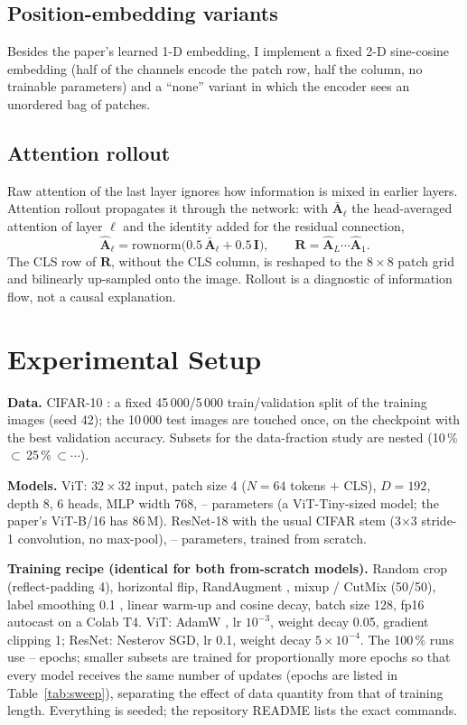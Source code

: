 \documentclass[conference]{IEEEtran}
\newif\ifdraft \drafttrue
\newcommand{\verify}[1]{\ifdraft{\color{red}#1}\else#1\fi}
\newcommand{\paramsVit}{--}\newcommand{\paramsRes}{--}\newcommand{\epochsVit}{--}\newcommand{\epochsRes}{--}
\begin{document}
\subsection{Position-embedding variants}
Besides the paper's learned 1-D embedding, I implement a fixed 2-D sine-cosine embedding (half of the channels encode the patch row, half the column, no trainable parameters) and a ``none'' variant in which the encoder sees an unordered bag of patches.

\subsection{Attention rollout}
Raw attention of the last layer ignores how information is mixed in earlier layers. Attention rollout \cite{abnar2020} propagates it through the network: with $\bar{\mathbf{A}}_\ell$ the head-averaged attention of layer $\ell$ and the identity added for the residual connection,
\begin{equation}
\hat{\mathbf{A}}_\ell=\mathrm{rownorm}\big(0.5\,\bar{\mathbf{A}}_\ell+0.5\,\mathbf{I}\big),\qquad
\mathbf{R}=\hat{\mathbf{A}}_L\cdots\hat{\mathbf{A}}_1 .
\end{equation}
The CLS row of $\mathbf{R}$, without the CLS column, is reshaped to the $8\times8$ patch grid and bilinearly up-sampled onto the image. Rollout is a diagnostic of information flow, not a causal explanation.

\section{Experimental Setup}\label{sec:setup}
\textbf{Data.} CIFAR-10 \cite{krizhevsky2009}: a fixed 45\,000/5\,000 train/validation split of the training images (seed 42); the 10\,000 test images are touched once, on the checkpoint with the best validation accuracy. Subsets for the data-fraction study are nested (10\,\%\,$\subset$\,25\,\%\,$\subset\cdots$).

\textbf{Models.} ViT: $32\times32$ input, patch size 4 ($N{=}64$ tokens $+$ CLS), $D{=}192$, depth 8, 6 heads, MLP width 768, \paramsVit{} parameters (a ViT-Tiny-sized model; the paper's ViT-B/16 has 86\,M). ResNet-18 \cite{he2016} with the usual CIFAR stem (3$\times$3 stride-1 convolution, no max-pool), \paramsRes{} parameters, trained from scratch.

\textbf{Training recipe (identical for both from-scratch models).} Random crop (reflect-padding 4), horizontal flip, RandAugment \cite{cubuk2020}, mixup \cite{zhang2018} / CutMix \cite{yun2019} (50/50), label smoothing 0.1 \cite{szegedy2016}, linear warm-up and cosine decay, batch size 128, fp16 autocast on a Colab T4. ViT: AdamW \cite{loshchilov2019}, lr $10^{-3}$, weight decay 0.05, gradient clipping 1; ResNet: Nesterov SGD, lr 0.1, weight decay $5{\times}10^{-4}$. \verify{The 100\,\% runs use \epochsVit{} epochs; smaller subsets are trained for proportionally more epochs so that every model receives the same number of updates (epochs are listed in Table~\ref{tab:sweep}), separating the effect of data quantity from that of training length.} Everything is seeded; the repository README lists the exact commands.
\end{document}
